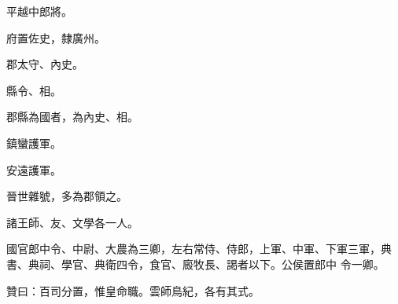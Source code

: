\begin{pinyinscope}
 平越中郎將。



 府置佐史，隸廣州。



 郡太守、內史。



 縣令、相。



 郡縣為國者，為內史、相。



 鎮蠻護軍。



 安遠護軍。



 晉世雜號，多為郡領之。



 諸王師、友、文學各一人。



 國官郎中令、中尉、大農為三卿，左右常侍、侍郎，上軍、中軍、下軍三軍，典書、典祠、學官、典衛四令，食官、廄牧長、謁者以下。公侯置郎中
 令一卿。



 贊曰：百司分置，惟皇命職。雲師鳥紀，各有其式。



\end{pinyinscope}